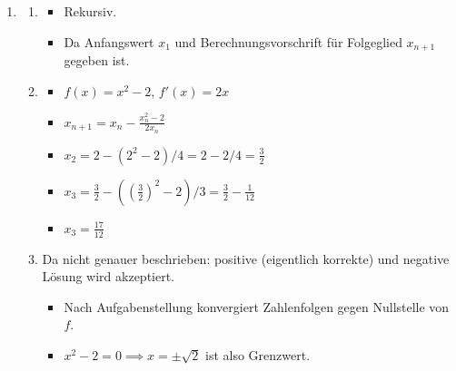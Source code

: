\documentclass[12pt]{article}
\begin{document}
{\begin{enumerate}
\begin{enumerate}
\item 
\begin{itemize}
\item Die eingetragen Funktion verläuft durch $(0,-1)$.
\item Der Funktionsgraph folgt etwa den eingezeichneten Richtungslinien.
\end{itemize}

\item $p(x) = \frac{1}{2}(x+1)(x-1)(x-2)$
\begin{itemize}
\item Fläche unter Graph von $p$ mit x-Achse zwische $x=1$ und $x=2$ ist markiert
\item Alle 3 Koordinaten, wo Ableitung 0 ist, wurden angegeben
\item Werte sind etwa korrekt: $(-0{,}75;0{,}50)$, $(0{,}75;1{,}50)$, $(2{,}4;0{,}50)$
\end{itemize}

\end{enumerate}


\item
\begin{enumerate}

\item
\begin{itemize}
\item Rekursiv.
\item Da Anfangswert $x_1$ und Berechnungsvorschrift für Folgeglied $x_{n+1}$ gegeben ist.
\end{itemize}

\item
\begin{itemize}
\item $f(x) = x^2-2$, $f'(x) = 2x$
\item $x_{n+1} = x_n - \frac{x_n^2-2}{2x_n}$
\item $x_2 = 2-(2^2-2)/4 = 2-2/4=\frac{3}{2}$
\item $x_3 = \frac{3}{2} - ((\frac{3}{2})^2-2)/3 = \frac{3}{2} - \frac{1}{12}$
\item $x_3 = \frac{17}{12}$
\end{itemize}

\item Da nicht genauer beschrieben: positive (eigentlich korrekte) und negative Lösung wird akzeptiert.
\begin{itemize}
\item Nach Aufgabenstellung konvergiert Zahlenfolgen gegen Nullstelle von $f$.
\item $x^2-2=0 \implies x=\pm\sqrt{2}$ ist also Grenzwert. 
\end{itemize}


\end{enumerate}
\end{enumerate}}
\end{document}
